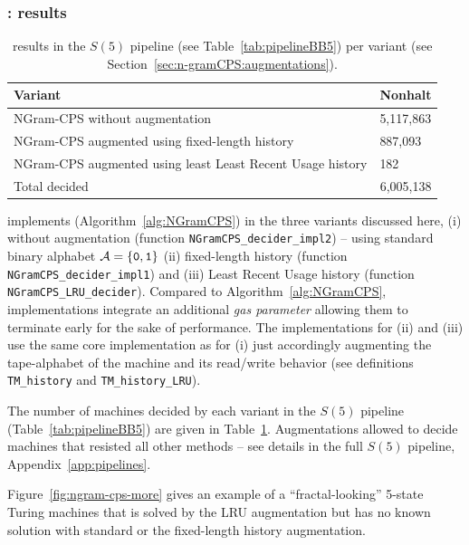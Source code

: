 \subsubsection{\ngramcps: results}\label{sec:n-gramCPS:results}
\begin{table}[h!]
    \centering
    \begin{tabular}{ll}
        Variant                                                    & Nonhalt                       \\  \hline
        NGram-CPS without augmentation                             & 5,117,863                     \\
        NGram-CPS augmented using fixed-length history             & 887,093                       \\
        NGram-CPS augmented using least Least Recent Usage history & 182                           \\ \hline
        Total decided                                              & \multicolumn{1}{r}{6,005,138}
    \end{tabular}
    \caption{\ngramcps results in the $S(5)$ pipeline (see Table~\ref{tab:pipelineBB5}) per variant (see Section~\ref{sec:n-gramCPS:augmentations}).}\label{tab:ngramcps:results}
\end{table}

\CoqBB implements \ngramcps (Algorithm~\ref{alg:NGramCPS}) in the three variants discussed here, (i) without augmentation (function \texttt{NGramCPS\_decider\_impl2}) -- \ie using standard binary alphabet $\mathcal{A}=\{\texttt{0},\texttt{1}\}$ (ii) fixed-length history (function \texttt{NGramCPS\_decider\_impl1}) and (iii) Least Recent Usage history (function \texttt{NGramCPS\_LRU\_decider}). Compared to Algorithm~\ref{alg:NGramCPS}, \CoqBB implementations integrate an additional \textit{gas parameter} allowing them to terminate early for the sake of performance. The implementations for (ii) and (iii) use the same core implementation as for (i) just accordingly augmenting the tape-alphabet of the machine and its read/write behavior (see definitions \texttt{TM\_history} and \texttt{TM\_history\_LRU}).

The number of machines decided by each \ngramcps variant in the $S(5)$ pipeline (Table~\ref{tab:pipelineBB5}) are given in Table~\ref{tab:ngramcps:results}. Augmentations allowed to decide machines that resisted all other methods -- see details in the full $S(5)$ pipeline, Appendix~\ref{app:pipelines}.

Figure~\ref{fig:ngram-cps-more} gives an example of a ``fractal-looking'' 5-state Turing machines that is solved by the LRU augmentation but has no known solution with standard \ngramcps or the fixed-length history augmentation.

